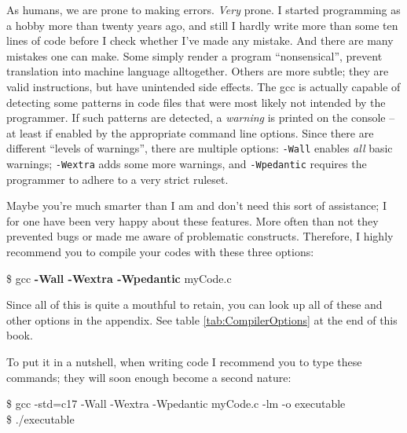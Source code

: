 As humans, we are prone to making errors. \emph{Very} prone. I started programming as a hobby more than twenty years ago, and still I hardly write more than some ten lines of code before I check whether I've made any mistake. And there are many mistakes one can make. Some simply render a program \enquote{nonsensical}, \ie prevent translation into machine language alltogether. Others are more subtle; they are valid instructions, but have unintended side effects. The gcc is actually capable of detecting some patterns in code files that were most likely not intended by the programmer. If such patterns are detected, a \emph{warning} is printed on the console -- at least if enabled by the appropriate command line options. Since there are different \enquote{levels of warnings}, there are multiple options: \texttt{-Wall} enables \emph{all} basic warnings; \texttt{-Wextra} adds some more warnings, and \texttt{-Wpedantic} requires the programmer to adhere to a very strict ruleset.

Maybe you're much smarter than I am and don't need this sort of assistance; I for one have been very happy about these features. More often than not they prevented bugs or made me aware of problematic constructs. Therefore, I highly recommend you to compile your codes with these three options:
\begin{cmdbox}
\$ gcc \textbf{-Wall -Wextra -Wpedantic} myCode.c
\end{cmdbox}

Since all of this is quite a mouthful to retain, you can look up all of these and other options in the appendix. See table \ref{tab:CompilerOptions} at the end of this book.

To put it in a nutshell, when writing code I recommend you to type these commands; they will soon enough become a second nature:
\begin{cmdbox}
\$ gcc -std=c17 -Wall -Wextra -Wpedantic myCode.c -lm -o executable \\
\$ ./executable
\end{cmdbox}

